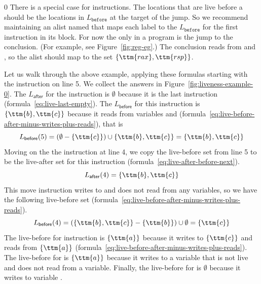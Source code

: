 \documentclass[7x10,nocrop]{TimesAPriori_MIT}%
\def\racketEd{0}
\def\edition{0}
\begin{document}
{\if\edition\racketEd
%
There is a special case for  instructions.  The locations
that are live before a  should be the locations in
$L_{\mathtt{before}}$ at the target of the jump. So we recommend
maintaining an alist named  that maps each label to
the $L_{\mathtt{before}}$ for the first instruction in its block. For
now the only  in a \LangXVar{} program is the jump to the
conclusion. (For example, see Figure~\ref{fig:reg-eg}.)  The
conclusion reads from  and , so the alist should map
 to the set $\{\ttm{rax},\ttm{rsp}\}$.
%
\fi}

Let us walk through the above example, applying these formulas
starting with the instruction on line 5. We collect the answers in
Figure~\ref{fig:liveness-example-0}.  The $L_{\mathsf{after}}$ for the
 instruction is $\emptyset$ because it is the last
instruction (formula~\ref{eq:live-last-empty}).  The
$L_{\mathsf{before}}$ for this instruction is $\{\ttm{b},\ttm{c}\}$
because it reads from variables  and 
(formula~\ref{eq:live-before-after-minus-writes-plus-reads}), that is
\[
   L_{\mathsf{before}}(5) = (\emptyset - \{\ttm{c}\}) \cup \{ \ttm{b}, \ttm{c} \} = \{ \ttm{b}, \ttm{c} \}
\]
Moving on the the instruction  at line 4, we copy
the live-before set from line 5 to be the live-after set for this
instruction (formula~\ref{eq:live-after-before-next}).
\[
  L_{\mathsf{after}}(4) = \{ \ttm{b}, \ttm{c} \}
\]
This move instruction writes to  and does not read from any
variables, so we have the following live-before set
(formula~\ref{eq:live-before-after-minus-writes-plus-reads}).
\[
  L_{\mathsf{before}}(4) = (\{\ttm{b},\ttm{c}\} - \{\ttm{b}\}) \cup \emptyset = \{ \ttm{c} \}
\]
The live-before for instruction 
is $\{\ttm{a}\}$ because it writes to $\{\ttm{c}\}$ and reads from $\{\ttm{a}\}$
(formula~\ref{eq:live-before-after-minus-writes-plus-reads}).  The
live-before for  is $\{\ttm{a}\}$ because it writes to a
variable that is not live and does not read from a variable.
Finally, the live-before for  is $\emptyset$
because it writes to variable .
\end{document}
